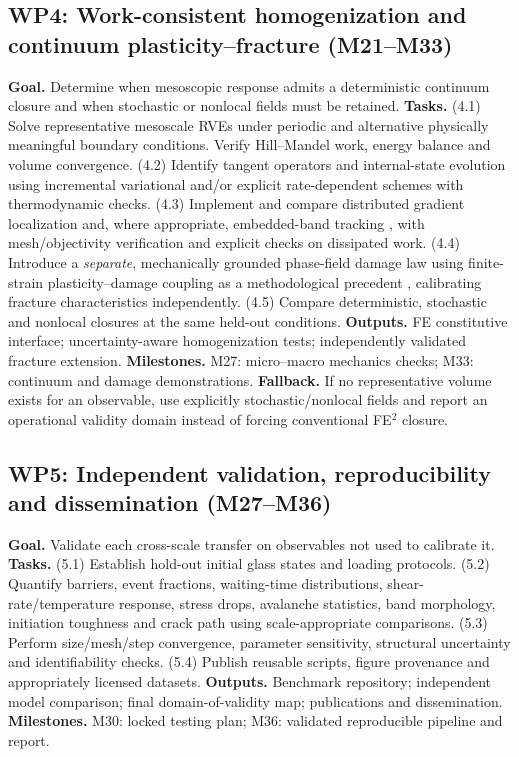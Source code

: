 \documentclass[11pt,a4paper]{article}
\begin{document}
\subsection{WP4: Work-consistent homogenization and continuum plasticity--fracture (M21--M33)}
\textbf{Goal.} Determine when mesoscopic response admits a deterministic continuum closure and when stochastic or nonlocal fields must be retained. \textbf{Tasks.} (4.1) Solve representative mesoscale RVEs under periodic and alternative physically meaningful boundary conditions. Verify Hill--Mandel work, energy balance and volume convergence. (4.2) Identify tangent operators and internal-state evolution using incremental variational and/or explicit rate-dependent schemes with thermodynamic checks. (4.3) Implement and compare distributed gradient localization \cite{miehegradient2014} and, where appropriate, embedded-band tracking \cite{jinlinder2019,linderraina2013,linderzhang2013}, with mesh/objectivity verification and explicit checks on dissipated work. (4.4) Introduce a \emph{separate}, mechanically grounded phase-field damage law using finite-strain plasticity--damage coupling as a methodological precedent \cite{mieheductile2016}, calibrating fracture characteristics independently. (4.5) Compare deterministic, stochastic and nonlocal closures at the same held-out conditions. \textbf{Outputs.} FE constitutive interface; uncertainty-aware homogenization tests; independently validated fracture extension. \textbf{Milestones.} M27: micro--macro mechanics checks; M33: continuum and damage demonstrations. \textbf{Fallback.} If no representative volume exists for an observable, use explicitly stochastic/nonlocal fields and report an operational validity domain instead of forcing conventional FE$^2$ closure.

\subsection{WP5: Independent validation, reproducibility and dissemination (M27--M36)}
\textbf{Goal.} Validate each cross-scale transfer on observables not used to calibrate it. \textbf{Tasks.} (5.1) Establish hold-out initial glass states and loading protocols. (5.2) Quantify barriers, event fractions, waiting-time distributions, shear-rate/temperature response, stress drops, avalanche statistics, band morphology, initiation toughness and crack path using scale-appropriate comparisons. (5.3) Perform size/mesh/step convergence, parameter sensitivity, structural uncertainty and identifiability checks. (5.4) Publish reusable scripts, figure provenance and appropriately licensed datasets. \textbf{Outputs.} Benchmark repository; independent model comparison; final domain-of-validity map; publications and dissemination. \textbf{Milestones.} M30: locked testing plan; M36: validated reproducible pipeline and report.
\end{document}
